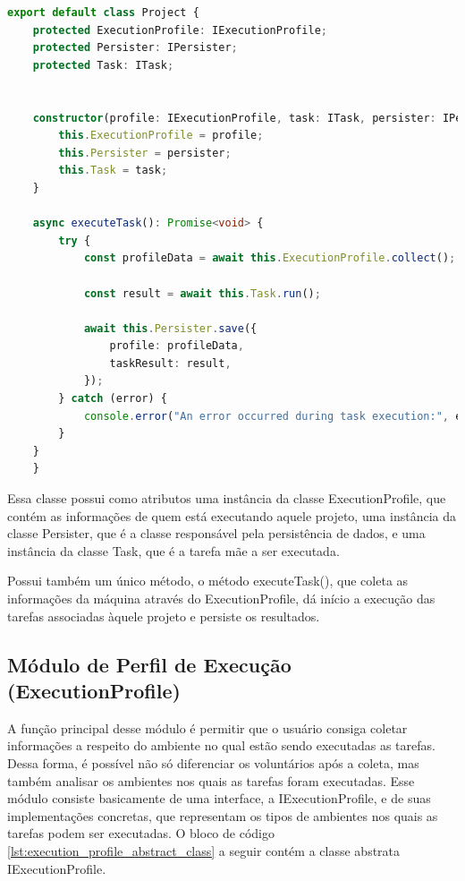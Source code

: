 \documentclass[12pt]{tcc}
\begin{document}
	\begin{lstlisting}[label={lst:project_class}, caption={Implementação da classe responsável por representar um projeto.}, language=TypeScript, breaklines=true]
	export default class Project {
	protected ExecutionProfile: IExecutionProfile;
	protected Persister: IPersister;
	protected Task: ITask;


	constructor(profile: IExecutionProfile, task: ITask, persister: IPersister) {
		this.ExecutionProfile = profile;
		this.Persister = persister;
		this.Task = task;
	}

	async executeTask(): Promise<void> {
		try {
			const profileData = await this.ExecutionProfile.collect();

			const result = await this.Task.run();

			await this.Persister.save({
				profile: profileData,
				taskResult: result,
			});
		} catch (error) {
			console.error("An error occurred during task execution:", error);
		}
	}
	}
	\end{lstlisting}

	Essa classe possui como atributos uma instância da classe ExecutionProfile, que contém as informações de quem está executando aquele projeto, uma instância da classe Persister, que é a classe responsável pela persistência de dados, e uma instância da classe Task, que é a tarefa mãe a ser executada.

	Possui também um único método, o método executeTask(), que coleta as informações da máquina através do ExecutionProfile, dá início a execução das tarefas associadas àquele projeto e persiste os resultados.

	\subsection{Módulo de Perfil de Execução (ExecutionProfile)}
	\label{subsection:modulo-execution-profile}

	A função principal desse módulo é permitir que o usuário consiga coletar informações a respeito do ambiente no qual estão sendo executadas as tarefas. Dessa forma, é possível não só diferenciar os voluntários após a coleta, mas também analisar os ambientes nos quais as tarefas foram executadas. Esse módulo consiste basicamente de uma interface, a IExecutionProfile, e de suas implementações concretas, que representam os tipos de ambientes nos quais as tarefas podem ser executadas. O bloco de código \ref{lst:execution_profile_abstract_class} a seguir contém a classe abstrata IExecutionProfile.
\end{document}
